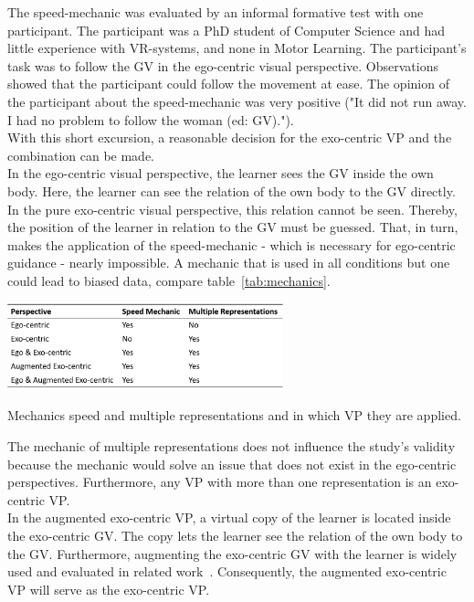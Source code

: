 The speed-mechanic was evaluated by an informal formative test with one participant. The participant was a PhD student of Computer Science and had little experience with VR-systems, and none in Motor Learning. The participant's task was to follow the GV in the ego-centric visual perspective. Observations showed that the participant could follow the movement at ease. The opinion of the participant about the speed-mechanic was very positive ("It did not run away. I had no problem to follow the woman (ed: GV).").\\
With this short excursion, a reasonable decision for the exo-centric VP and the combination can be made.\\

In the ego-centric visual perspective, the learner sees the GV inside the own body. Here, the learner can see the relation of the own body to the GV directly. In the pure exo-centric visual perspective, this relation cannot be seen. Thereby, the position of the learner in relation to the GV must be guessed. That, in turn, makes the application of the speed-mechanic - which is necessary for ego-centric guidance - nearly impossible. A mechanic that is used in all conditions but one could lead to biased data, compare table~\ref{tab:mechanics}.
\begin{table}[htb]
	\centering
	\includegraphics[width=0.6\textwidth]{figures/mechanics_comparison.png}
	\caption[Mechanics for Motor Learing in Virtual Reality]{Mechanics speed and multiple representations and in which VP they are applied.}
	\label{tab:mechanics}
\end{table}
The mechanic of multiple representations does not influence the study's validity because the mechanic would solve an issue that does not exist in the ego-centric perspectives. Furthermore, any VP with more than one representation is an exo-centric VP.\\
In the augmented exo-centric VP, a virtual copy of the learner is located inside the exo-centric GV. The copy lets the learner see the relation of the own body to the GV. Furthermore, augmenting the exo-centric GV with the learner is widely used and evaluated in related work~\cite{YouMove,thaichichua}. Consequently, the augmented exo-centric VP will serve as the exo-centric VP.\\

